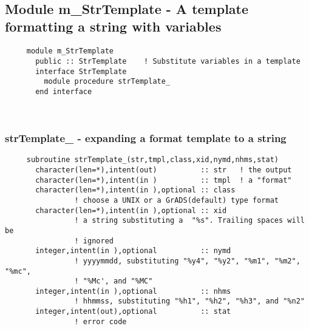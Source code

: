 
 
 
\mbox{}\hrulefill\ 
 

  \subsection{Module m\_StrTemplate - A template formatting a string with variables }

\begin{verbatim} 
     module m_StrTemplate
       public :: StrTemplate	! Substitute variables in a template
       interface StrTemplate
         module procedure strTemplate_
       end interface
 \end{verbatim}%
 
 
\mbox{}\hrulefill\ 

  \subsubsection{strTemplate\_ - expanding a format template to a string}

\begin{verbatim} 
     subroutine strTemplate_(str,tmpl,class,xid,nymd,nhms,stat)
       character(len=*),intent(out)          :: str   ! the output
       character(len=*),intent(in )          :: tmpl  ! a "format"
       character(len=*),intent(in ),optional :: class
                ! choose a UNIX or a GrADS(default) type format
       character(len=*),intent(in ),optional :: xid
                ! a string substituting a  "%s". Trailing spaces will be 
                ! ignored
       integer,intent(in ),optional          :: nymd
                ! yyyymmdd, substituting "%y4", "%y2", "%m1", "%m2", "%mc", 
                ! "%Mc', and "%MC"
       integer,intent(in ),optional          :: nhms
                ! hhmmss, substituting "%h1", "%h2", "%h3", and "%n2"
       integer,intent(out),optional          :: stat
                ! error code
 \end{verbatim}%
 
